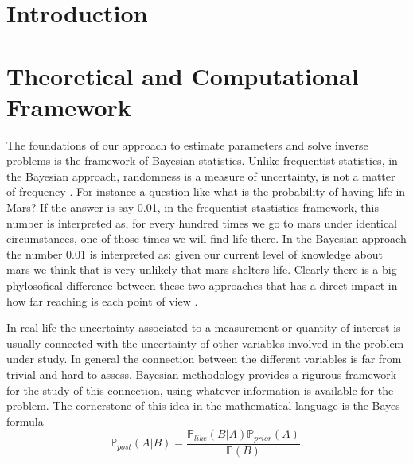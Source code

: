 \documentclass[12pt]{book}
\newcommand{\post}{\mathbb{P}_{post}}
\newcommand{\like}{\mathbb{P}_{like}}
\newcommand{\prior}{\mathbb{P}_{prior}}
\newcommand{\p}{\mathbb{P}}
\begin{document}
\chapter{Introduction}

\newpage

\chapter{Theoretical and Computational Framework}


The foundations of  our approach to estimate parameters and solve inverse problems is  the 
framework of Bayesian statistics. Unlike frequentist statistics, in the Bayesian approach, randomness
is a measure of uncertainty, is not a matter of frequency . For instance a question like
what is the probability of having  life in Mars? If the answer is say 0.01, in the frequentist
stastistics framework, this number is interpreted as, for every hundred times we go to 
mars under identical circumstances, one of those times we will find life there. In the Bayesian
approach the number 0.01 is interpreted as: given our current level of knowledge about mars
we think that is very unlikely that mars shelters life. Clearly there is a big phylosofical
difference between these two approaches that has a direct impact in how far reaching is each point of view  \cite{jaynes2003probability}.


In real life the uncertainty associated to a  measurement or  quantity of interest is usually 
connected  with the uncertainty  of other variables involved in the problem under study.
In general the connection between the different variables is far from trivial and hard to assess.
Bayesian methodology provides a rigurous framework for the study of 
this connection, using whatever information
is available for the problem. The cornerstone of this idea
in the mathematical language is the  Bayes formula 
\begin{equation}\label{eqnBayes}
\post(A|B)=\frac{\like(B|A)\prior(A)}{\p(B)}.
\end{equation}
\end{document}
